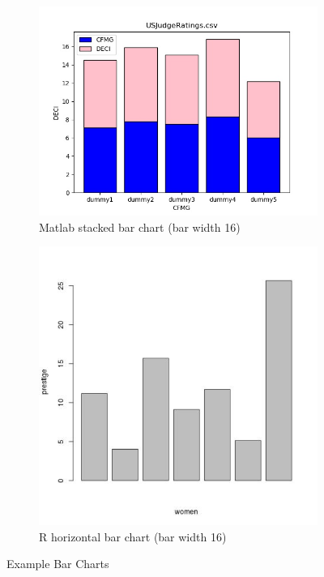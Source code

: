 \documentclass[12pt, a4paper,oneside]{report}
\begin{document}
\begin{figure}[!htbp]
	\begin{subfigure}{.5\textwidth}
		\centering
		\includegraphics[width=.8\linewidth]{bar1}
		\caption{Matlab stacked bar chart (bar width 16) }
		\label{fig:bar1}
	\end{subfigure}%
	\begin{subfigure}{.5\textwidth}
		\centering
		\includegraphics[width=.8\linewidth]{bar2}
		\caption{R horizontal bar chart (bar width 16)}
		\label{fig:bar2}
	\end{subfigure}
	\caption{Example Bar Charts}
	\label{fig:bars}
\end{figure}
\end{document}
